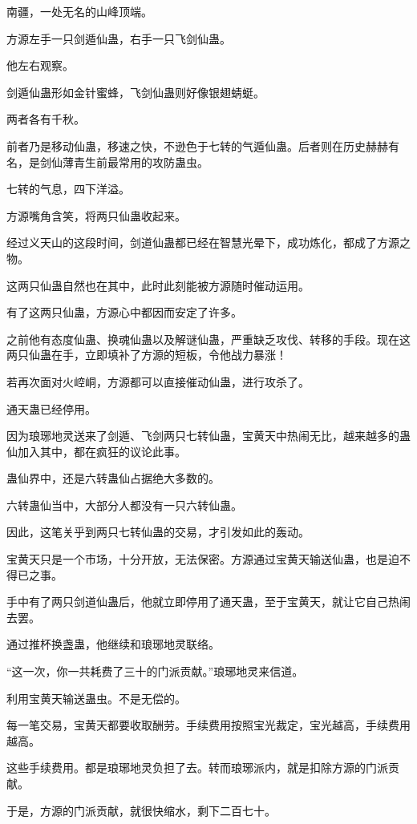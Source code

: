 
\begin{this_body}

南疆，一处无名的山峰顶端。

方源左手一只剑遁仙蛊，右手一只飞剑仙蛊。

他左右观察。

剑遁仙蛊形如金针蜜蜂，飞剑仙蛊则好像银翅蜻蜓。

两者各有千秋。

前者乃是移动仙蛊，移速之快，不逊色于七转的气遁仙蛊。后者则在历史赫赫有名，是剑仙薄青生前最常用的攻防蛊虫。

七转的气息，四下洋溢。

方源嘴角含笑，将两只仙蛊收起来。

经过义天山的这段时间，剑道仙蛊都已经在智慧光晕下，成功炼化，都成了方源之物。

这两只仙蛊自然也在其中，此时此刻能被方源随时催动运用。

有了这两只仙蛊，方源心中都因而安定了许多。

之前他有态度仙蛊、换魂仙蛊以及解谜仙蛊，严重缺乏攻伐、转移的手段。现在这两只仙蛊在手，立即填补了方源的短板，令他战力暴涨！

若再次面对火崆峒，方源都可以直接催动仙蛊，进行攻杀了。

通天蛊已经停用。

因为琅琊地灵送来了剑遁、飞剑两只七转仙蛊，宝黄天中热闹无比，越来越多的蛊仙加入其中，都在疯狂的议论此事。

蛊仙界中，还是六转蛊仙占据绝大多数的。

六转蛊仙当中，大部分人都没有一只六转仙蛊。

因此，这笔关乎到两只七转仙蛊的交易，才引发如此的轰动。

宝黄天只是一个市场，十分开放，无法保密。方源通过宝黄天输送仙蛊，也是迫不得已之事。

手中有了两只剑道仙蛊后，他就立即停用了通天蛊，至于宝黄天，就让它自己热闹去罢。

通过推杯换盏蛊，他继续和琅琊地灵联络。

“这一次，你一共耗费了三十的门派贡献。”琅琊地灵来信道。

利用宝黄天输送蛊虫。不是无偿的。

每一笔交易，宝黄天都要收取酬劳。手续费用按照宝光裁定，宝光越高，手续费用越高。

这些手续费用。都是琅琊地灵负担了去。转而琅琊派内，就是扣除方源的门派贡献。

于是，方源的门派贡献，就很快缩水，剩下二百七十。


\end{this_body}
